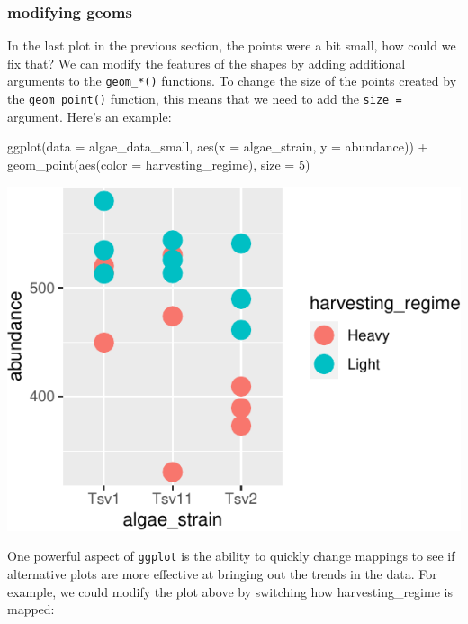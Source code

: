\documentclass[
]{krantz}
\newenvironment{Shaded}{\begin{snugshade}}{\end{snugshade}}
\newcommand{\AttributeTok}[1]{\textcolor[rgb]{0.77,0.63,0.00}{#1}}
\newcommand{\DecValTok}[1]{\textcolor[rgb]{0.00,0.00,0.81}{#1}}
\newcommand{\FunctionTok}[1]{\textcolor[rgb]{0.00,0.00,0.00}{#1}}
\newcommand{\NormalTok}[1]{#1}
\newcommand{\SpecialCharTok}[1]{\textcolor[rgb]{0.00,0.00,0.00}{#1}}
\begin{document}
\hypertarget{modifying-geoms}{%
\subsubsection{modifying geoms}\label{modifying-geoms}}

In the last plot in the previous section, the points were a bit small, how could we fix that? We can modify the features of the shapes by adding additional arguments to the \texttt{geom\_*()} functions. To change the size of the points created by the \texttt{geom\_point()} function, this means that we need to add the \texttt{size\ =} argument. Here's an example:

\begin{Shaded}
\begin{Highlighting}[]
\FunctionTok{ggplot}\NormalTok{(}\AttributeTok{data =}\NormalTok{ algae\_data\_small, }\FunctionTok{aes}\NormalTok{(}\AttributeTok{x =}\NormalTok{ algae\_strain, }\AttributeTok{y =}\NormalTok{ abundance)) }\SpecialCharTok{+} 
  \FunctionTok{geom\_point}\NormalTok{(}\FunctionTok{aes}\NormalTok{(}\AttributeTok{color =}\NormalTok{ harvesting\_regime), }\AttributeTok{size =} \DecValTok{5}\NormalTok{)}
\end{Highlighting}
\end{Shaded}

\begin{center}\includegraphics[width=0.8\linewidth]{index_files/figure-latex/unnamed-chunk-25-1} \end{center}

One powerful aspect of \texttt{ggplot} is the ability to quickly change mappings to see if alternative plots are more effective at bringing out the trends in the data. For example, we could modify the plot above by switching how harvesting\_regime is mapped:
\end{document}
